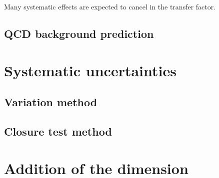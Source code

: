 Many systematic effects are expected to cancel in the transfer factor. 

\subsection{QCD background prediction}
\section{Systematic uncertainties}
\subsection{Variation method}
\subsection{Closure test method}
\section{Addition of the \mht dimension}
